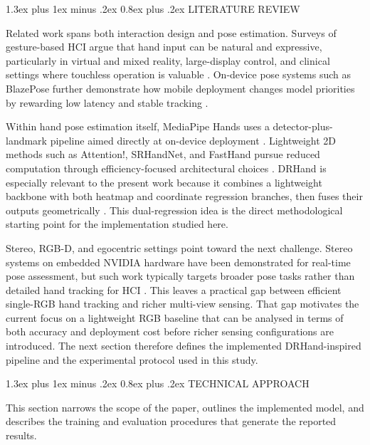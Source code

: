 \documentclass[10pt,letterpaper,twocolumn]{article}
\makeatletter
\renewcommand\section{\@startsection{section}{1}{\z@}%
  {1.3ex plus 1ex minus .2ex}%
  {0.8ex plus .2ex}%
  {\centering\normalfont\small\scshape}}
\makeatother
\begin{document}
\section{LITERATURE REVIEW}

Related work spans both interaction design and pose estimation. Surveys of gesture-based HCI argue that hand input can be natural and expressive, particularly in virtual and mixed reality, large-display control, and clinical settings where touchless operation is valuable \cite{vuletic,wachs,li_vr}. On-device pose systems such as BlazePose further demonstrate how mobile deployment changes model priorities by rewarding low latency and stable tracking \cite{blazepose}.

Within hand pose estimation itself, MediaPipe Hands uses a detector-plus-landmark pipeline aimed directly at on-device deployment \cite{mediapipe}. Lightweight 2D methods such as Attention!, SRHandNet, and FastHand pursue reduced computation through efficiency-focused architectural choices \cite{attentionlite,srhandnet,fasthand}. DRHand is especially relevant to the present work because it combines a lightweight backbone with both heatmap and coordinate regression branches, then fuses their outputs geometrically \cite{dualreg}. This dual-regression idea is the direct methodological starting point for the implementation studied here.

Stereo, RGB-D, and egocentric settings point toward the next challenge. Stereo systems on embedded NVIDIA hardware have been demonstrated for real-time pose assessment, but such work typically targets broader pose tasks rather than detailed hand tracking for HCI \cite{stereojetson}. This leaves a practical gap between efficient single-RGB hand tracking and richer multi-view sensing. That gap motivates the current focus on a lightweight RGB baseline that can be analysed in terms of both accuracy and deployment cost before richer sensing configurations are introduced. The next section therefore defines the implemented DRHand-inspired pipeline and the experimental protocol used in this study.

\section{TECHNICAL APPROACH}

This section narrows the scope of the paper, outlines the implemented model, and describes the training and evaluation procedures that generate the reported results.
\end{document}

